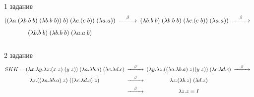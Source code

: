 \documentclass{article}
\begin{document}
\\ 1 задание
$$
  \begin{CD}
    ((\lambda a.(\lambda b.b\;b)\;(\lambda b.b\;b))\;b)\;(\lambda c.(c\;b))\;(\lambda a.a)) @>\beta>> (\lambda b.b\;b)\;(\lambda b.b\;b)\;(\lambda c.(c\;b))\;(\lambda a.a))@>\beta>>\\(\lambda b.b\;b)\;(\lambda b.b\;b)\;(\lambda a.a\;b)
  \end{CD}
$$
\\ 2 задание
$$
\begin{CD}
    S K K = (\lambda x.\lambda y. \lambda z.(x\;z)\;(y\;z))\;(\lambda a.\lambda b.a)\;(\lambda c.\lambda d.c)@>\beta>>(\lambda y. \lambda z.((\lambda a.\lambda b.a)\;z)(y\;z))\;(\lambda c.\lambda d.c)@>\beta>>\\ \lambda z.((\lambda a.\lambda b.a)\;z)\;((\lambda c.\lambda d.c)\;z)@>\beta>>\lambda z.(\lambda b.z)\;(\lambda d.z)\\ @>\beta>>
    \lambda z.z = I
  \end{CD}
$$
\end{document}
